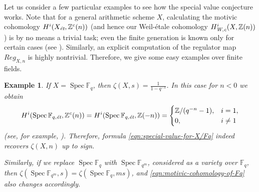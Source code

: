 \documentclass[10pt,a4paper,oneside,draft]{article}
\DeclareMathOperator{\Spec}{Spec}
\newcommand{\FF}{\mathbb{F}}
\newcommand{\ZZ}{\mathbb{Z}}
\newcommand{\et}{\text{\it \'{e}t}}
\newcommand{\Wc}{\text{\it W,c}}
\theoremstyle{myplain}
\theoremstyle{mydefinition}
\newtheorem{example}[theorem]{Example}
\numberwithin{equation}{section}
\begin{document}
Let us consider a few particular examples to see how the special value
conjecture works. Note that for a general arithmetic scheme $X$, calculating the
motivic cohomology $H^i (X_\et, \ZZ^c (n))$ (and hence our Weil-\'{e}tale
cohomology $H^i_\Wc (X, \ZZ(n))$) is by no means a trivial task; even the finite
generation is known only for certain cases
(see \cite[\S 8]{Beshenov-Weil-etale-1}). Similarly, an explicit computation of
the regulator map $Reg_{X,n}$ is highly nontrivial. Therefore, we give some easy
examples over finite fields.

\begin{example}
  \label{example:C(X,n)-for-Spec-Fq}
  If $X = \Spec \FF_q$, then $\zeta (X,s) = \frac{1}{1 - q^{-s}}$. In this case
  for $n < 0$ we obtain
  \begin{equation}
    \label{eqn:motivic-cohomology-of-Fq}
    H^i (\Spec \FF_{q,\et}, \ZZ^c (n)) = H^i (\Spec \FF_{q,\et}, \ZZ (-n)) =
    \begin{cases}
      \ZZ/(q^{-n} - 1), & i = 1, \\
      0, & i \ne 1
    \end{cases}
  \end{equation}
  (see, for example, \cite[Example~4.2]{Geisser-2017}). Therefore, formula
  \eqref{eqn:special-value-for-X/Fq} indeed recovers $\zeta (X,n)$ up to sign.

  Similarly, if we replace $\Spec \FF_q$ with $\Spec \FF_{q^m}$, considered as a
  variety over $\FF_q$, then
  $\zeta (\Spec \FF_{q^m},s) = \zeta (\Spec \FF_q, ms)$, and
  \eqref{eqn:motivic-cohomology-of-Fq} also changes accordingly.
\end{example}
\end{document}
